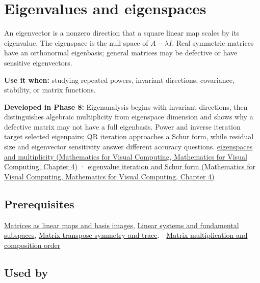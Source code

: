 \hypertarget{appendix-0b3be18411f9}{}\label{referencestart:appendix-0b3be18411f9}
\section{Eigenvalues and eigenspaces}\label{appendix-0b3be18411f9-eigenvalues-and-eigenspaces}

An eigenvector is a nonzero direction that a square linear map scales by its eigenvalue. The eigenspace is the null space of \(A-\lambda I\). Real symmetric matrices have an orthonormal eigenbasis; general matrices may be defective or have sensitive eigenvectors.

\textbf{Use it when:} studying repeated powers, invariant directions, covariance, stability, or matrix functions.

\textbf{Developed in Phase 8:} Eigenanalysis begins with invariant directions, then distinguishes algebraic multiplicity from eigenspace dimension and shows why a defective matrix may not have a full eigenbasis. Power and inverse iteration target selected eigenpairs; QR iteration approaches a Schur form, while residual size and eigenvector sensitivity answer different accuracy questions. \href{../02-Mathematics-for-Visual-Computing/main.pdf\#nameddest=01-foundations-i-ch020-eigenvalues-eigenspaces-and-the-two-kinds-of-multiplicity}{eigenspaces and multiplicity (Mathematics for Visual Computing, Mathematics for Visual Computing, Chapter 4)} · \href{../02-Mathematics-for-Visual-Computing/main.pdf\#nameddest=01-foundations-i-ch020-qr-iteration-and-jacobi-rotations-preserve-the-spectrum-while-simplifying-shape}{eigenvalue iteration and Schur form (Mathematics for Visual Computing, Mathematics for Visual Computing, Chapter 4)}

\subsection{Prerequisites}\label{appendix-0b3be18411f9-prerequisites}

\hyperref[appendix-bd39c3bf5d64]{Matrices as linear maps and basis images}, \hyperref[appendix-8572a4a060c1]{Linear systems and fundamental subspaces}, \hyperref[appendix-175ca5ff874d]{Matrix transpose symmetry and trace}. - \hyperref[appendix-ab31ef447dbf]{Matrix multiplication and composition order}

\subsection{Used by}\label{appendix-0b3be18411f9-used-by}


